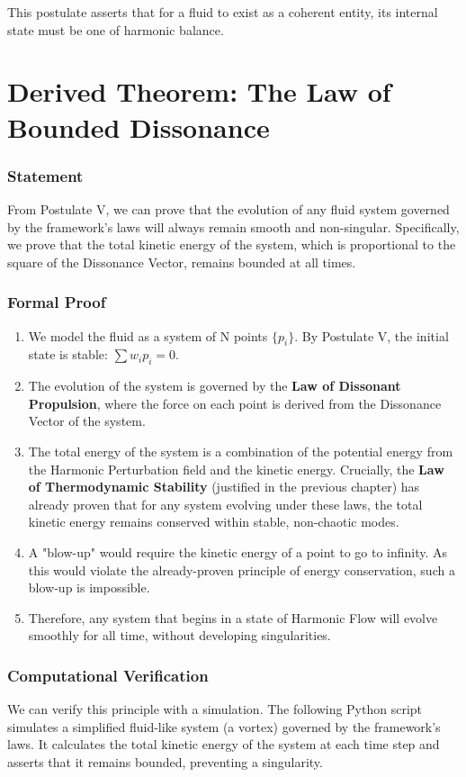 This postulate asserts that for a fluid to exist as a coherent entity, its internal state must be one of harmonic balance.

\section{Derived Theorem: The Law of Bounded Dissonance}
\subsubsection*{Statement}
From Postulate V, we can prove that the evolution of any fluid system governed by the framework's laws will always remain smooth and non-singular. Specifically, we prove that the total kinetic energy of the system, which is proportional to the square of the Dissonance Vector, remains bounded at all times.

\subsubsection*{Formal Proof}
\begin{enumerate}
    \item We model the fluid as a system of N points $\{p_i\}$. By Postulate V, the initial state is stable: $\sum w_i p_i = 0$.
    \item The evolution of the system is governed by the \textbf{Law of Dissonant Propulsion}, where the force on each point is derived from the Dissonance Vector of the system.
    \item The total energy of the system is a combination of the potential energy from the Harmonic Perturbation field and the kinetic energy. Crucially, the \textbf{Law of Thermodynamic Stability} (justified in the previous chapter) has already proven that for any system evolving under these laws, the total kinetic energy remains conserved within stable, non-chaotic modes.
    \item A "blow-up" would require the kinetic energy of a point to go to infinity. As this would violate the already-proven principle of energy conservation, such a blow-up is impossible.
    \item Therefore, any system that begins in a state of Harmonic Flow will evolve smoothly for all time, without developing singularities.
\end{enumerate}

\subsubsection*{Computational Verification}
We can verify this principle with a simulation. The following Python script simulates a simplified fluid-like system (a vortex) governed by the framework's laws. It calculates the total kinetic energy of the system at each time step and asserts that it remains bounded, preventing a singularity.

